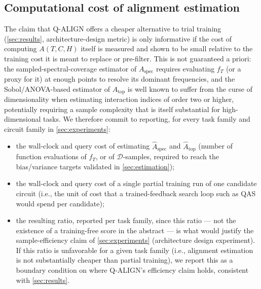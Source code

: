 \documentclass[11pt]{article}
\newcommand{\Aspec}{A_{\mathrm{spec}}}
\newcommand{\Atop}{A_{\mathrm{top}}}
\newcommand{\fT}{f_T}
\begin{document}
\subsection{Computational cost of alignment estimation}
\label{sec:cost}
The claim that Q-ALIGN offers a cheaper alternative to trial training (\cref{sec:results}, architecture-design metric) is only informative if the cost of computing $A(T,C,H)$ itself is measured and shown to be small relative to the training cost it is meant to replace or pre-filter. This is not guaranteed a priori: the sampled-spectral-coverage estimator of $\Aspec$ requires evaluating $\fT$ (or a proxy for it) at enough points to resolve its dominant frequencies, and the Sobol/ANOVA-based estimator of $\Atop$ is well known to suffer from the curse of dimensionality when estimating interaction indices of order two or higher, potentially requiring a sample complexity that is itself substantial for high-dimensional tasks. We therefore commit to reporting, for every task family and circuit family in \cref{sec:experiments}:
\begin{itemize}[leftmargin=1.8em]
    \item the wall-clock and query cost of estimating $\hat\Aspec$ and $\hat\Atop$ (number of function evaluations of $\fT$, or of $\mathcal{D}$-samples, required to reach the bias/variance targets validated in \cref{sec:estimation});
    \item the wall-clock and query cost of a single partial training run of one candidate circuit (i.e., the unit of cost that a trained-feedback search loop such as QAS would spend per candidate);
    \item the resulting ratio, reported per task family, since this ratio --- not the existence of a training-free score in the abstract --- is what would justify the sample-efficiency claim of \cref{sec:experiments} (architecture design experiment). If this ratio is unfavorable for a given task family (i.e., alignment estimation is not substantially cheaper than partial training), we report this as a boundary condition on where Q-ALIGN's efficiency claim holds, consistent with \cref{sec:results}.
\end{itemize}
\end{document}
